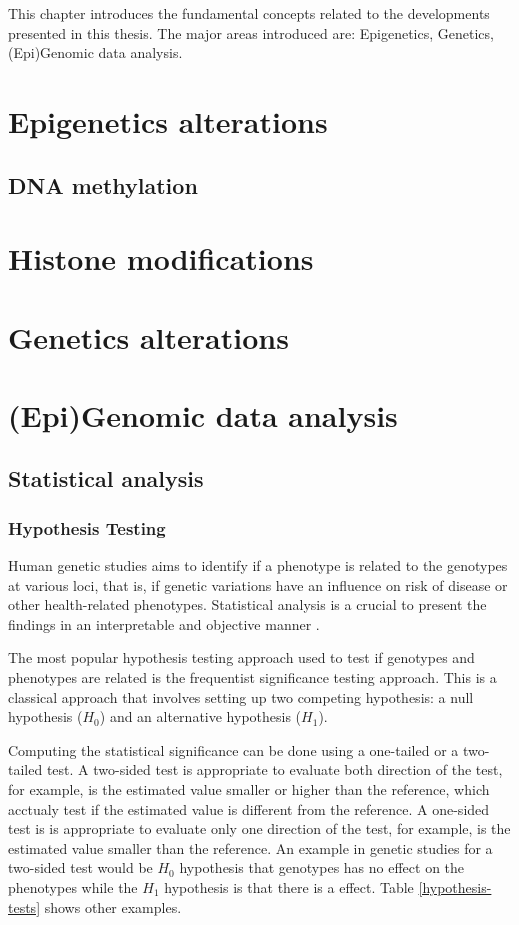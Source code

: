 This chapter introduces the fundamental concepts related to the developments presented in this thesis. The major areas introduced are: Epigenetics, Genetics, (Epi)Genomic data analysis.


\section{Epigenetics alterations}
\subsection{DNA methylation}
\section{Histone modifications}

\section{Genetics alterations}


\section{(Epi)Genomic data analysis}

\subsection{Statistical analysis}

\subsubsection{Hypothesis Testing}

Human genetic studies aims to identify if a phenotype is related to the genotypes
at various loci, that is, if genetic variations have an influence on risk of
disease or other health-related phenotypes.
Statistical analysis is a crucial to present the findings in an
interpretable and objective manner \cite{sham2014statistical}.

The most popular hypothesis testing approach used to test if
genotypes and phenotypes are related  is the frequentist significance testing approach.
This is a classical approach that involves setting up two competing hypothesis: a
null hypothesis ($H_0$) and an alternative hypothesis ($H_1$).

Computing the statistical significance can be done using a one-tailed or a two-tailed test.
A two-sided test is appropriate to evaluate both direction of the test, for example,
is the estimated value smaller or higher than the reference, which acctualy test if the
 estimated value is different from the reference.
A one-sided test is  is appropriate to evaluate only one direction of the test,
for example, is the estimated value smaller than the reference.
An example in genetic studies for a two-sided test would be $H_0$
hypothesis that genotypes has no effect on the phenotypes
while the $H_1$ hypothesis is that there is a effect.
Table \ref{hypothesis-tests} shows other examples.

